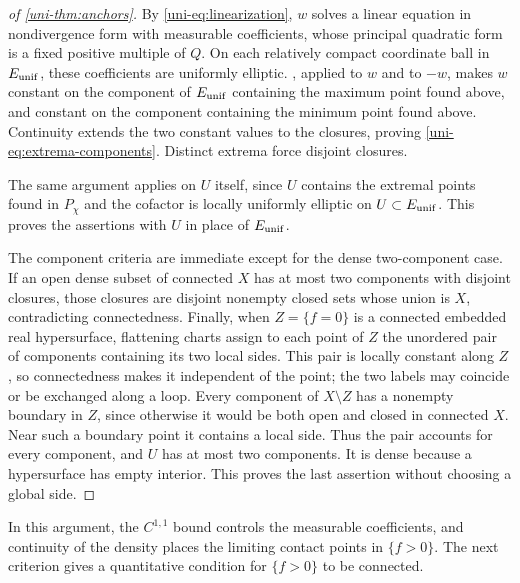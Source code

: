 \begin{proof}[of \cref{uni-thm:anchors}]
By \eqref{uni-eq:linearization}, $w$ solves a linear equation in nondivergence form with measurable coefficients,
whose principal quadratic form is a fixed positive multiple of $Q$.  On
each relatively compact coordinate ball in $E_{\rm unif}$, these coefficients
are uniformly elliptic.  , applied to $w$ and to $-w$, makes $w$
constant on the component of $E_{\rm unif}$ containing the maximum point found above, and
constant on the component containing the minimum point found above.  Continuity
extends the two constant values to the closures, proving
\eqref{uni-eq:extrema-components}.  Distinct extrema force disjoint closures.

The same argument applies on $U$ itself, since $U$ contains the extremal points found in $P_\chi$ and the cofactor is locally uniformly elliptic on $U\subset E_{\rm unif}$. This proves the assertions with $U$ in place of $E_{\rm unif}$.

The component criteria are immediate except for the dense two-component
case.  If an open dense subset of connected $X$ has at most two components
with disjoint closures, those closures are disjoint nonempty closed sets
whose union is $X$, contradicting connectedness.  Finally, when
$Z=\{f=0\}$ is a connected embedded real hypersurface, flattening charts
assign to each point of $Z$ the unordered pair of components containing its two local sides. This pair is locally constant along $Z$, so connectedness makes it independent of the point; the two labels may coincide or be exchanged along a loop. Every component of $X\setminus Z$ has a nonempty boundary in $Z$, since otherwise it would be both open and closed in connected $X$. Near such a boundary point it contains a local side. Thus the pair accounts for every component, and $U$ has at most two components. It is dense because a hypersurface has empty interior. This proves the last assertion without choosing a global side.
\end{proof}


In this argument, the $C^{1,1}$ bound controls the measurable coefficients, and continuity of the density places the limiting contact points in $\{f>0\}$. The next criterion gives a quantitative condition for $\{f>0\}$ to be connected.
